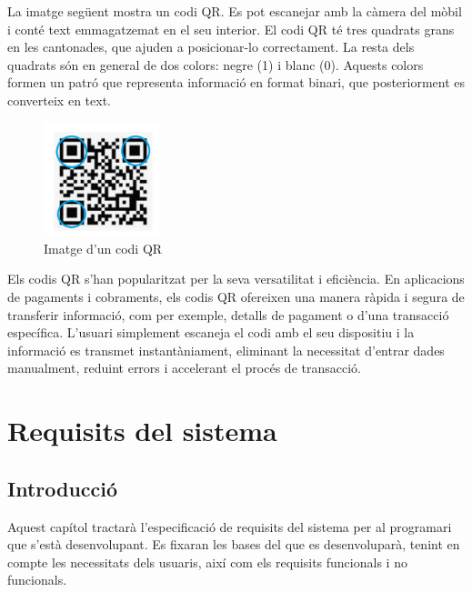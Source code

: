 \documentclass[a4paper,12pt,twoside]{ThesisStyle}
\begin{document}
La imatge següent mostra un codi QR. Es pot escanejar amb la càmera del mòbil i conté text emmagatzemat en el seu interior. El codi QR té tres quadrats grans en les cantonades, que ajuden a posicionar-lo correctament. La resta dels quadrats són en general de dos colors: negre (1) i blanc (0). Aquests colors formen un patró que representa informació en format binari, que posteriorment es converteix en text.

\begin{figure}[h!] %
    \centering
    \includegraphics[width=0.3\textwidth]{imatges/qr2.png} %
    \caption{Imatge d'un codi QR} %
    \label{fig:Imatge d'un codi QR} %
  \end{figure}

  Els codis QR s'han popularitzat per la seva versatilitat i eficiència. En aplicacions de pagaments i cobraments, els codis QR ofereixen una manera ràpida i segura de transferir informació, com per exemple, detalls de pagament o d'una transacció específica. L'usuari simplement escaneja el codi amb el seu dispositiu i la informació es transmet instantàniament, eliminant la necessitat d'entrar dades manualment, reduint errors i accelerant el procés de transacció.\\


\chapter{Requisits del sistema}
\label{chp:requisits}




\section{Introducció}
\label{subsec:Introducció}

Aquest capítol tractarà l'especificació de requisits del sistema per al programari que s'està desenvolupant. Es fixaran les bases del que es desenvoluparà, tenint en compte les necessitats dels usuaris, així com els requisits funcionals i no funcionals.\\
\end{document}
